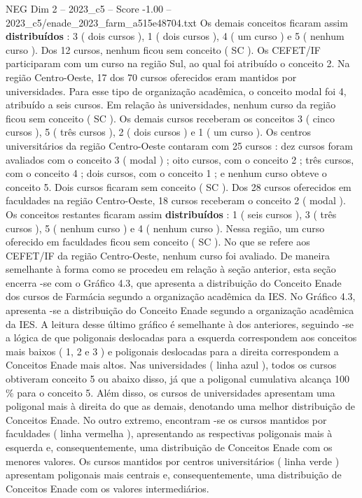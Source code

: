 \begin{textsample}{NEG Dim 2 – 2023\_c5 – Score -1.00 – 2023\_c5/enade\_2023\_farm\_a515e48704.txt}
Os demais conceitos ficaram assim \textbf{distribuídos} : 3 ( dois cursos ), 1 ( dois cursos ), 4 ( um curso ) e 5 ( nenhum curso ).
Dos 12 cursos, nenhum ficou sem conceito ( SC ).
Os CEFET/IF participaram com um curso na região Sul, ao qual foi atribuído o conceito 2.
Na região Centro-Oeste, 17 dos 70 cursos oferecidos eram mantidos por universidades.
Para esse tipo de organização acadêmica, o conceito modal foi 4, atribuído a seis cursos.
Em relação às universidades, nenhum curso da região ficou sem conceito ( SC ).
Os demais cursos receberam os conceitos 3 ( cinco cursos ), 5 ( três cursos ), 2 ( dois cursos ) e 1 ( um curso ).
Os centros universitários da região Centro-Oeste contaram com 25 cursos : dez cursos foram avaliados com o conceito 3 ( modal ) ; oito cursos, com o conceito 2 ; três cursos, com o conceito 4 ; dois cursos, com o conceito 1 ; e nenhum curso obteve o conceito 5.
Dois cursos ficaram sem conceito ( SC ).
Dos 28 cursos oferecidos em faculdades na região Centro-Oeste, 18 cursos receberam o conceito 2 ( modal ).
Os conceitos restantes ficaram assim \textbf{distribuídos} : 1 ( seis cursos ), 3 ( três cursos ), 5 ( nenhum curso ) e 4 ( nenhum curso ).
Nessa região, um curso oferecido em faculdades ficou sem conceito ( SC ).
No que se refere aos CEFET/IF da região Centro-Oeste, nenhum curso foi avaliado.
De maneira semelhante à forma como se procedeu em relação à seção anterior, esta seção encerra -se com o Gráfico 4.3, que apresenta a distribuição do Conceito Enade dos cursos de Farmácia segundo a organização acadêmica da IES.
No Gráfico 4.3, apresenta -se a distribuição do Conceito Enade segundo a organização acadêmica da IES.
A leitura desse último gráfico é semelhante à dos anteriores, seguindo -se a lógica de que poligonais deslocadas para a esquerda correspondem aos conceitos mais baixos ( 1, 2 e 3 ) e poligonais deslocadas para a direita correspondem a Conceitos Enade mais altos.
Nas universidades ( linha azul ), todos os cursos obtiveram conceito 5 ou abaixo disso, já que a poligonal cumulativa alcança 100 \% para o conceito 5.
Além disso, os cursos de universidades apresentam uma poligonal mais à direita do que as demais, denotando uma melhor distribuição de Conceitos Enade.
No outro extremo, encontram -se os cursos mantidos por faculdades ( linha vermelha ), apresentando as respectivas poligonais mais à esquerda e, consequentemente, uma distribuição de Conceitos Enade com os menores valores.
Os cursos mantidos por centros universitários ( linha verde ) apresentam poligonais mais centrais e, consequentemente, uma distribuição de Conceitos Enade com os valores intermediários.

\end{textsample}
